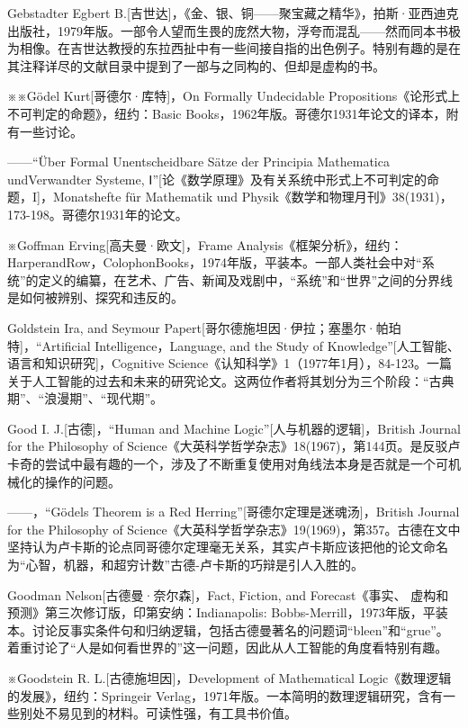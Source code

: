 \documentclass[
  12pt,
  twoside,
  openright,
  oldfontcommands,
]{memoir}
\begin{document}
Gebstadter Egbert B.{[}吉世达{]}，《金、银、铜------聚宝藏之精华》，拍斯·亚西迪克出版社，1979年版。一部令人望而生畏的庞然大物，浮夸而混乱------然而同本书极为相像。在吉世达教授的东拉西扯中有一些间接自指的出色例子。特别有趣的是在其注释详尽的文献目录中提到了一部与之同构的、但却是虚构的书。

※※Gödel Kurt{[}哥德尔·库特{]}，On Formally Undecidable Propositions《论形式上不可判定的命题》，纽约：Basic Books，1962年版。哥德尔1931年论文的译本，附有一些讨论。

------``Über Formal Unentscheidbare Sätze der Principia Mathematica undVerwandter Systeme, Ⅰ''{[}论《数学原理》及有关系统中形式上不可判定的命题，I{]}，Monatshefte für Mathematik und Physik《数学和物理月刊》38(1931)，173-198。哥德尔1931年的论文。

※Goffman Erving{[}高夫曼·欧文{]}，Frame Analysis《框架分析》，纽约：HarperandRow，ColophonBooks，1974年版，平装本。一部人类社会中对``系统''的定义的编纂，在艺术、广告、新闻及戏剧中，``系统''和``世界''之间的分界线是如何被辨别、探究和违反的。

Goldstein Ira, and Seymour Papert{[}哥尔德施坦因·伊拉；塞墨尔·帕珀特{]}，``Artificial Intelligence，Language, and the Study of Knowledge''{[}人工智能、语言和知识研究{]}，Cognitive Science《认知科学》1（1977年1月），84-123。一篇关于人工智能的过去和未来的研究论文。这两位作者将其划分为三个阶段：``古典期''、``浪漫期''、``现代期''。

Good I. J.{[}古德{]}，``Human and Machine Logic''{[}人与机器的逻辑{]}，British Journal for the Philosophy of Science《大英科学哲学杂志》18(1967)，第144页。是反驳卢卡奇的尝试中最有趣的一个，涉及了不断重复使用对角线法本身是否就是一个可机械化的操作的问题。

------，``Gödel\textquotesingle s Theorem is a Red Herring''{[}哥德尔定理是迷魂汤{]}，British Journal for the Philosophy of Science《大英科学哲学杂志》19(1969)，第357。古德在文中坚持认为卢卡斯的论点同哥德尔定理毫无关系，其实卢卡斯应该把他的论文命名为``心智，机器，和超穷计数''古德-卢卡斯的巧辩是引人入胜的。

Goodman Nelson{[}古德曼·奈尔森{]}，Fact, Fiction, and Forecast《事实、 虚构和预测》第三次修订版，印第安纳：Indianapolis: Bobbs-Merrill，1973年版，平装本。讨论反事实条件句和归纳逻辑，包括古德曼著名的问题词``bleen''和``grue''。着重讨论了``人是如何看世界的''这一问题，因此从人工智能的角度看特别有趣。

※Goodstein R. L.{[}古德施坦因{]}，Development of Mathematical Logic《数理逻辑的发展》，纽约：Springeir Verlag，1971年版。一本简明的数理逻辑研究，含有一些别处不易见到的材料。可读性强，有工具书价值。
\end{document}
